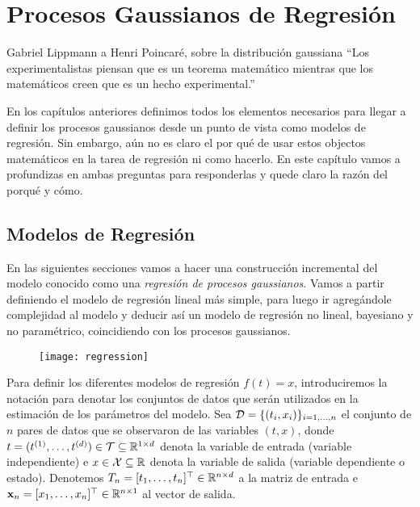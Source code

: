 
\chapter{Procesos Gaussianos de Regresión}
\label{sec:gaussian}

\begin{chapquote}{Gabriel Lippmann a Henri Poincaré, sobre la distribución gaussiana}
	``Los experimentalistas piensan que es un teorema matemático mientras que los matemáticos creen que es un hecho experimental.''
\end{chapquote}

En los capítulos anteriores definimos todos los elementos necesarios para llegar a definir los procesos gaussianos desde un punto de vista como modelos de regresión. Sin embargo, aún no es claro el por qué de usar estos objectos matemáticos en la tarea de regresión ni como hacerlo. En este capítulo vamos a profundizas en ambas preguntas para responderlas y quede claro la razón del porqué y cómo.



\section{Modelos de Regresión}

En las siguientes secciones vamos a hacer una construcción incremental del modelo conocido como una \emph{regresión de procesos gaussianos}. Vamos a partir definiendo el modelo de regresión lineal más simple, para luego ir agregándole complejidad al modelo y deducir así un modelo de regresión no lineal, bayesiano y no paramétrico, coincidiendo con los procesos gaussianos.

\begin{figure}[h]
	\centering
	\texttt{[image: regression]}
\end{figure}

Para definir los diferentes modelos de regresión \(f(t) = x\), introduciremos la notación para denotar los conjuntos de datos que serán utilizados en la estimación de los parámetros del modelo. Sea \(\mathcal{D} = \{(t_i, x_i)\}_{i = 1, \dotsc, n}\) el conjunto de \(n\) pares de datos que se observaron de las variables \((t, x)\), donde \(t = (t^{(1)}, \dotsc, t^{(d)}) \in \mathcal{T} \subseteq \mathbb{R}^{1 \times d}\) denota la variable de entrada (variable independiente) e \(x \in \mathcal{X} \subseteq \mathbb{R}\) denota la variable de salida (variable dependiente o estado). Denotemos \(T_n = [t_1, \dotsc, t_n]^{\top} \in \mathbb{R}^{n \times d}\) a la matriz de entrada e \(\mathbf{x}_n = [x_1, \dotsc, x_n]^{\top} \in \mathbb{R}^{n \times 1}\) al vector de salida.

